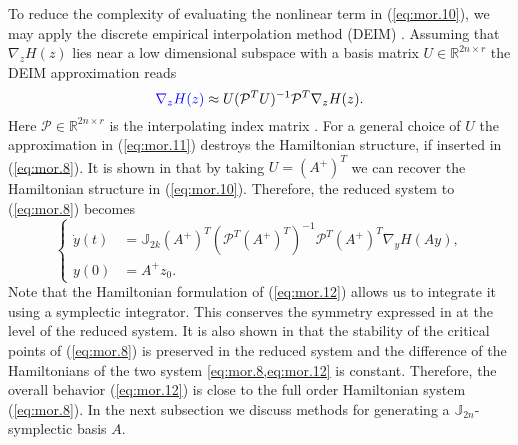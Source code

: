 To reduce the complexity of evaluating the nonlinear term in (\ref{eq:mor.10}), we may apply the discrete empirical interpolation method (DEIM) \cite{barrault2004empirical,Chaturantabut:2010cz,wirtz2014posteriori}. Assuming that $\nabla_z H(z)$ lies near a low dimensional subspace with a basis matrix $U\in \mathbb R^{2n\times r}$ the DEIM approximation reads
\begin{equation} \label{eq:mor.11}
	\editA{\nabla_z H(z)} \approx U (\mathcal P^T U)^{-1} \mathcal P^T \nabla_z H(z).
\end{equation}
Here $\mathcal P \in \mathbb R^{2n\times r}$ is the interpolating index matrix \cite{Chaturantabut:2010cz}. For a general choice of $U$ the approximation in (\ref{eq:mor.11}) destroys the Hamiltonian structure, if inserted in (\ref{eq:mor.8}). It is shown in \cite{doi:10.1137/17M1111991} that by taking $U = (A^+)^T$ we can recover the Hamiltonian structure in (\ref{eq:mor.10}). Therefore, the reduced system to (\ref{eq:mor.8}) becomes
\begin{equation} \label{eq:mor.12}
\left\{
\begin{aligned}
	\dot y(t) &= \mathbb J_{2k} (A^+)^T(\mathcal P^T (A^+)^T)^{-1} \mathcal P^T (A^+)^T \nabla_y H(Ay), \\
	y(0) &= A^+ z_0.
\end{aligned}
\right.
\end{equation}
Note that the Hamiltonian formulation of (\ref{eq:mor.12}) allows us to integrate it using a symplectic integrator. This conserves the symmetry expressed in  at the level of the reduced system. It is also shown in \cite{doi:10.1137/17M1111991,doi:10.1137/140978922} that the stability of the critical points of (\ref{eq:mor.8}) is preserved in the reduced system and the difference of the Hamiltonians of the two system \cref{eq:mor.8,eq:mor.12} is constant. Therefore, the overall behavior (\ref{eq:mor.12}) is close to the full order Hamiltonian system (\ref{eq:mor.8}). In the next subsection we discuss methods for generating a $\mathbb J_{2n}$-symplectic basis $A$.

